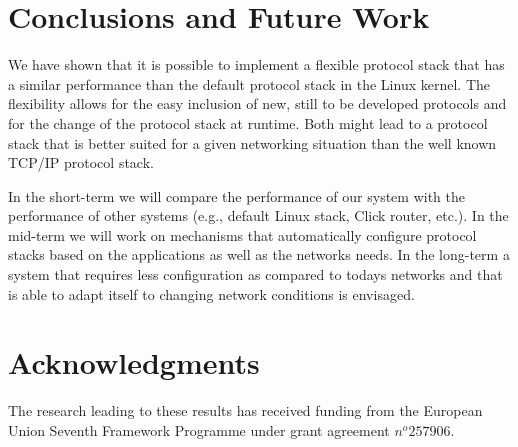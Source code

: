 \documentclass{sig-alternate}
\begin{document}
\section{Conclusions and Future Work}
We have shown that it is possible to implement a flexible protocol stack that has a similar performance than the default protocol stack in the Linux kernel. The flexibility allows for the easy inclusion of new, still to be developed protocols and for the change of the protocol stack at runtime. Both might lead to a protocol stack that is better suited for a given networking situation than the well known TCP/IP protocol stack.

In the short-term we will compare the performance of our system with the performance of other systems (e.g., default Linux stack, Click router, etc.). 
In the mid-term we will work on mechanisms that automatically configure protocol stacks based on the applications as well as the networks needs. 
In the long-term a system that requires less configuration as compared to todays networks and that is able to adapt itself to changing network conditions is envisaged.   





\section{Acknowledgments}
The research leading to these results has received funding from the European Union Seventh Framework Programme under grant agreement $n^o 257906$.
%

%
%
\end{document}
